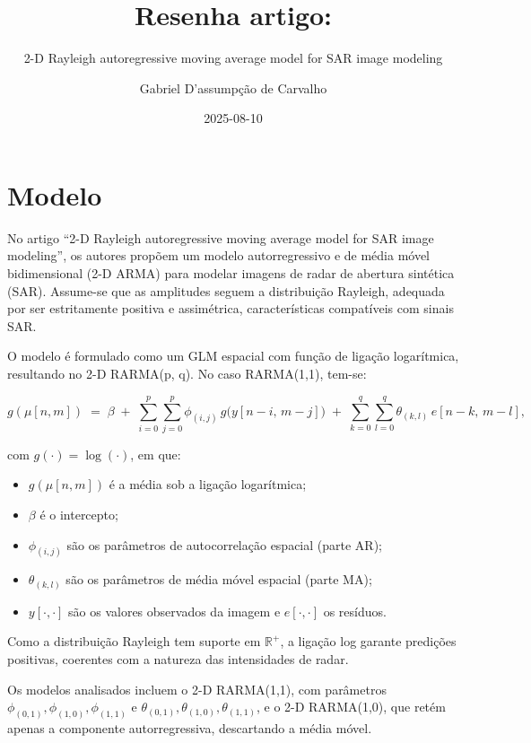 \documentclass[
]{article}
\title{Resenha artigo:}
\subtitle{2-D Rayleigh autoregressive moving average model for SAR image modeling}
\author{Gabriel D'assumpção de Carvalho}
\date{2025-08-10}
\begin{document}
\maketitle

{
\setcounter{tocdepth}{2}
\tableofcontents
}
\hypertarget{modelo}{%
\section{Modelo}\label{modelo}}

No artigo ``2-D Rayleigh autoregressive moving average model for SAR image modeling'', os autores propõem um modelo autorregressivo e de média móvel bidimensional (2-D ARMA) para modelar imagens de radar de abertura sintética (SAR). Assume-se que as amplitudes seguem a distribuição Rayleigh, adequada por ser estritamente positiva e assimétrica, características compatíveis com sinais SAR.

O modelo é formulado como um GLM espacial com função de ligação logarítmica, resultando no 2-D RARMA(p, q). No caso RARMA(1,1), tem-se:

\[
g(\mu[n,m]) \;=\; \beta \;+\; \sum_{i=0}^{p}\sum_{j=0}^{p} \phi_{(i,j)}\, g\!\big(y[n-i,\,m-j]\big)
\;+\; \sum_{k=0}^{q}\sum_{l=0}^{q} \theta_{(k,l)}\, e[n-k,\,m-l],
\]

com \(g(\cdot)=\log(\cdot)\), em que:

\begin{itemize}
  \item \(g(\mu[n,m])\) é a média sob a ligação logarítmica;
  \item \(\beta\) é o intercepto;
  \item \(\phi_{(i,j)}\) são os parâmetros de autocorrelação espacial (parte AR);
  \item \(\theta_{(k,l)}\) são os parâmetros de média móvel espacial (parte MA);
  \item \(y[\cdot,\cdot]\) são os valores observados da imagem e \(e[\cdot,\cdot]\) os resíduos.
\end{itemize}

Como a distribuição Rayleigh tem suporte em \(\mathbb{R}^+\), a ligação log garante predições positivas, coerentes com a natureza das intensidades de radar.

Os modelos analisados incluem o 2-D RARMA(1,1), com parâmetros \(\phi_{(0,1)}, \phi_{(1,0)}, \phi_{(1,1)}\) e \(\theta_{(0,1)}, \theta_{(1,0)}, \theta_{(1,1)}\), e o 2-D RARMA(1,0), que retém apenas a componente autorregressiva, descartando a média móvel.
\end{document}

